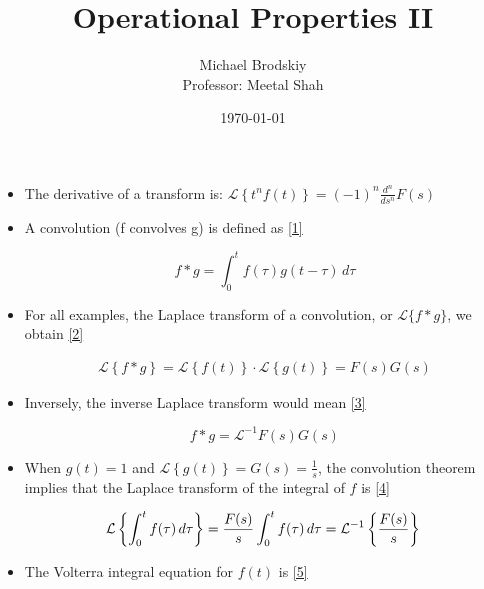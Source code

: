 \documentclass[12pt]{article}
\title{Operational Properties II}
\date{\today}
\author{Michael Brodskiy\\ \small Professor: Meetal Shah}
\begin{document}
\maketitle

\begin{itemize}

  \item The derivative of a transform is: $\mathcal{L}\left\{ t^nf(t) \right\}=(-1)^n\frac{d^n}{ds^n}F(s)$

  \item A convolution (f convolves g) is defined as \eqref{1}

    \begin{equation}
      f\ast g=\int_0^t f(\tau)g(t-\tau)\,d\tau
      \label{1}
    \end{equation}

  \item For all examples, the Laplace transform of a convolution, or $\mathcal{L}\{f\ast g\}$, we obtain \eqref{2}

    \begin{equation}
      \begin{split}
        \mathcal{L}\left\{ f\ast g \right\}=\mathcal{L}\left\{ f(t) \right\}\cdot\mathcal{L}\left\{ g(t) \right\}=F(s)G(s)
      \end{split}
      \label{2}
    \end{equation}

  \item Inversely, the inverse Laplace transform would mean \eqref{3}

    \begin{equation}
      f\ast g=\mathcal{L}^{-1}{F(s)G(s)}
      \label{3}
    \end{equation}
  
  \item When $g(t)=1$ and $\mathcal{L}\left\{ g(t) \right\}=G(s)=\frac{1}{s}$, the convolution theorem implies that the Laplace transform of the integral of $f$ is \eqref{4}

    \begin{equation}
      \mathcal{L}\left\{ \int_0^t f(\tau)\,d\tau \right\}=\frac{F(s)}{s}\\
      \int_0^t f(\tau)\,d\tau=\mathcal{L}^{-1}\left\{\frac{F(s)}{s}\right\}\\
      \label{4}
    \end{equation}

  \item The Volterra integral equation for $f(t)$ is \eqref{5}


\end{itemize}
\end{document}
